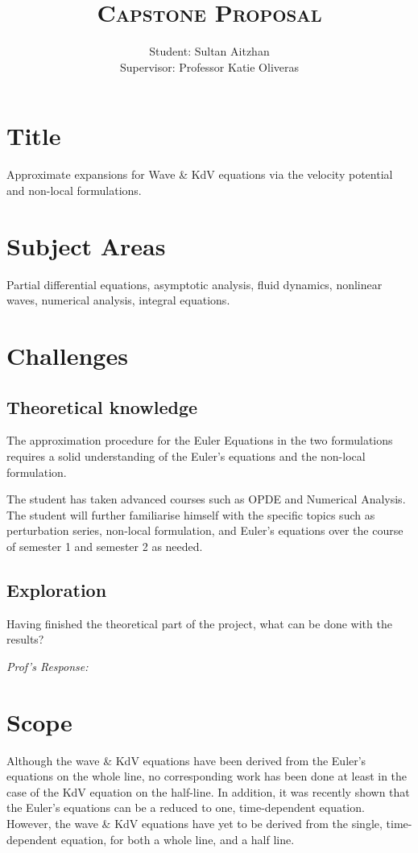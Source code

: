 \documentclass[10pt, oneside, a4paper]{article}
\author{
    Student: Sultan Aitzhan\\
    Supervisor: Professor Katie Oliveras
    }
\title{\textsc{Capstone Proposal}}
\date{\vspace{-5ex}}
\begin{document}
\maketitle

\thispagestyle{fancy}


\section{Title}
Approximate expansions for Wave \& KdV equations via the velocity potential and non-local formulations.

\section{Subject Areas}
Partial differential equations, asymptotic analysis, fluid dynamics, nonlinear waves, numerical analysis, integral equations.

\section{Challenges}
\subsection{Theoretical knowledge}
The approximation procedure for the Euler Equations in the two formulations requires a solid understanding of the Euler's equations and the non-local formulation. 

The student has taken advanced courses such as OPDE and Numerical Analysis. The student will further familiarise himself with the specific topics such as perturbation series, non-local formulation, and Euler's equations over the course of semester 1 and semester 2 as needed.

\subsection{Exploration}
Having finished the theoretical part of the project, what can be done with the results?

\emph{Prof's Response:}

\section{Scope}
Although the wave \& KdV equations have been derived from the Euler's equations on the whole line, no corresponding work has been done at least in the case of the KdV equation on the half-line. In addition, it was recently shown that the Euler's equations can be a reduced to one, time-dependent equation. However, the wave \& KdV equations have yet to be derived from the single, time-dependent equation, for both a whole line, and a half line.
\end{document}
